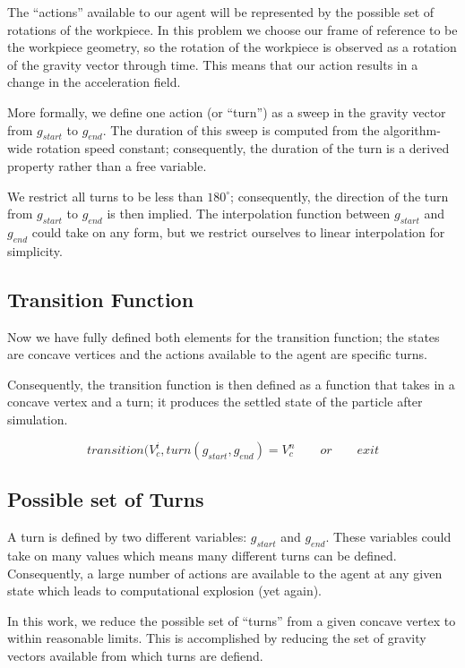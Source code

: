 The ``actions'' available to our agent will be represented by the possible set of rotations of the workpiece. In this problem we choose our frame of reference to be the workpiece geometry, so the rotation of the workpiece is observed as a rotation of the gravity vector through time. This means that our action results in a change in the acceleration field.

More formally, we define one action (or ``turn'') as a sweep in the gravity vector from $g_{start}$ to $g_{end}$. The duration of this sweep is computed from the algorithm-wide rotation speed constant; consequently, the duration of the turn is a derived property rather than a free variable.

We restrict all turns to be less than $180^{\circ}$; consequently, the direction of the turn from $g_{start}$ to $g_{end}$ is then implied. The interpolation function between $g_{start}$ and $g_{end}$ could take on any form, but we restrict ourselves to linear interpolation for simplicity.

	\subsection{Transition Function}

Now we have fully defined both elements for the transition function; the states are concave vertices and the actions available to the agent are specific turns.

Consequently, the transition function is then defined as a function that takes in a concave vertex and a turn; it produces the settled state of the particle after simulation.

$$
transition(V_{c}^{i}, turn(g_{start}, g_{end}) = V_{c}^n \qquad or \qquad exit
$$

	\subsection{Possible set of Turns}

A turn is defined by two different variables: $g_{start}$ and $g_{end}$. These variables could take on many values which means many different turns can be defined. Consequently, a large number of actions are available to the agent at any given state which leads to computational explosion (yet again).

In this work, we reduce the possible set of ``turns'' from a given concave vertex to within reasonable limits. This is accomplished by reducing the set of gravity vectors available from which turns are defiend.

